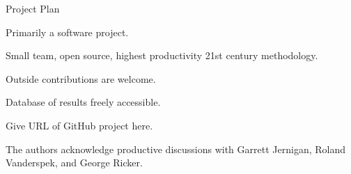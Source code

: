\documentclass[final,hyperref={pdfpagelabels=false}]{beamer}
\begin{document}
Project Plan

Primarily a software project.

Small team, open source, highest productivity 21st century methodology.

Outside contributions are welcome.

Database of results freely accessible.

Give URL of GitHub project here.

The authors acknowledge productive discussions with Garrett Jernigan, Roland Vanderspek, and George Ricker.
%
\end{document}
